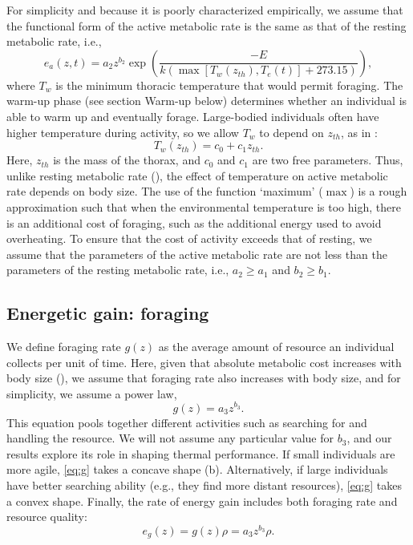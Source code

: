 For simplicity and because it is poorly characterized empirically, we assume that the functional form of the active metabolic rate is the same as that of the resting metabolic rate, i.e.,
\begin{equation} \label{eq:ea}
	e_a(z,t) = a_2 z^{b_2}  \exp \left(\frac{-E}{k (\max[T_w(z_{th}), T_e(t)]+ 273.15)} \right),
\end{equation}
where $T_w$ is the minimum thoracic temperature that would permit foraging.
The warm-up phase (see section Warm-up below) determines whether an individual is able to warm up and eventually forage. %
Large-bodied individuals often have higher temperature during activity, so we allow $T_w$ to depend on $z_{th}$, as in \citet{Bartholomew1977a}:
\begin{equation} \label{eq:Tw}
	T_w(z_{th}) = c_0+ c_1 z_{th}.
\end{equation}
Here, $z_{th}$ is the mass of the thorax, and $c_0$ and $c_1$ are two free parameters.
Thus, unlike resting metabolic rate (), the effect of temperature on active metabolic rate depends on body size.
The use of the function `maximum' ($\max$) is a rough approximation such that when the environmental temperature is too high, there is an additional cost of foraging, such as the additional energy used to avoid overheating.
To ensure that the cost of activity exceeds that of resting, we assume that the parameters of the active metabolic rate are not less than the parameters of the resting metabolic rate, i.e., $a_2 \geq a_1$ and $b_2 \geq b_1$. %

\subsection*{Energetic gain: foraging}

We define foraging rate $g(z)$ as the average amount of resource an individual collects per unit of time.
Here, given that absolute metabolic cost increases with body size (), we assume that foraging rate also increases with body size, and for simplicity, we assume a power law,
\begin{equation} \label{eq:g}
	g(z) = a_3 z^{b_3}.
\end{equation}
This equation pools together different activities such as searching for and handling the resource.
We will not assume any particular value for $b_3$, and our results explore its role in shaping thermal performance.
If small individuals are more agile, \cref{eq:g} takes a concave shape (b).
Alternatively, if large individuals have better searching ability (e.g., they find more distant resources), \cref{eq:g} takes a convex shape.
Finally, the rate of energy gain includes both foraging rate and resource quality:
\begin{equation} \label{eq:eg}
	e_g(z) = g(z) \rho = a_3 z^{b_3} \rho.
\end{equation}

